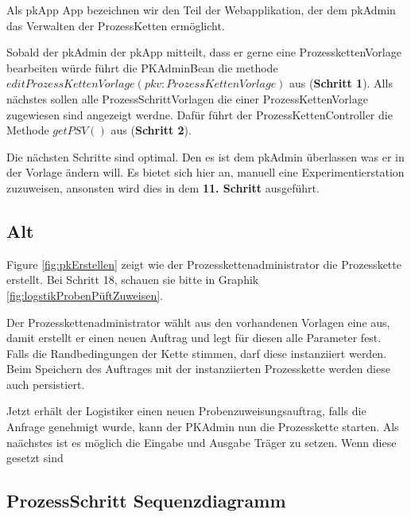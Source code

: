 \documentclass[enabledeprecatedfontcommands,fontsize=12pt,paper=a4,twoside]{scrartcl}
\begin{document}
{Als pkApp  App bezeichnen wir den Teil der Webapplikation, der dem pkAdmin
das Verwalten der ProzessKetten ermöglicht.

Sobald der pkAdmin der pkApp mitteilt, dass er gerne eine ProzesskettenVorlage
bearbeiten würde führt die PKAdminBean die methode
$editProzessKettenVorlage(pkv:ProzessKettenVorlage)$ aus (\textbf{Schritt 1}).
Alls nächstes sollen alle ProzessSchrittVorlagen die einer ProzessKettenVorlage
zugewiesen sind angezeigt werdne. Dafür führt der ProzessKettenController die
Methode $getPSV()$ aus (\textbf{Schritt 2}).

Die nächsten Schritte sind optimal. Den es ist dem pkAdmin überlassen was er in
der Vorlage ändern will. Es bietet sich hier an, manuell eine
Experimentierstation zuzuweisen, ansonsten wird dies in dem \textbf{11. Schritt}
ausgeführt.



\subsection{Alt}
Figure \ref{fig:pkErstellen} zeigt wie der Prozesskettenadministrator die Prozesskette erstellt. 
Bei Schritt 18, schauen sie bitte in Graphik \ref{fig:logstikProbenPüftZuweisen}. 

Der Prozesskettenadministrator wählt aus den vorhandenen Vorlagen eine aus, damit erstellt er einen neuen Auftrag und legt für diesen alle Parameter fest.
Falls die Randbedingungen der Kette stimmen, darf diese instanziiert werden. Beim Speichern des Auftrages mit der instanziierten Prozesskette werden diese auch persistiert.

Jetzt erhält der Logistiker einen neuen Probenzuweisungsauftrag, falls die Anfrage genehmigt wurde, kann der PKAdmin nun die Prozesskette starten.
Als naächstes ist es möglich die Eingabe und Ausgabe Träger zu setzen. Wenn
diese gesetzt sind



\subsection{ProzessSchritt Sequenzdiagramm}




}
\end{document}
